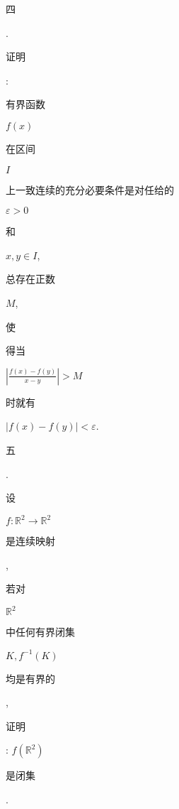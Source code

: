 \documentclass[10pt]{article}
\begin{document}
\begin{CJK}{UTF8}{mj}四\end{CJK}. \begin{CJK}{UTF8}{mj}证明\end{CJK}: \begin{CJK}{UTF8}{mj}有界函数\end{CJK} $f(x)$ \begin{CJK}{UTF8}{mj}在区间\end{CJK} $I$ \begin{CJK}{UTF8}{mj}上一致连续的充分必要条件是对任给的\end{CJK} $\varepsilon>0$ \begin{CJK}{UTF8}{mj}和\end{CJK} $x, y \in I$, \begin{CJK}{UTF8}{mj}总存在正数\end{CJK} $M$, \begin{CJK}{UTF8}{mj}使\end{CJK} \begin{CJK}{UTF8}{mj}得当\end{CJK} $\left|\frac{f(x)-f(y)}{x-y}\right|>M$ \begin{CJK}{UTF8}{mj}时就有\end{CJK} $|f(x)-f(y)|<\varepsilon$.

\begin{CJK}{UTF8}{mj}五\end{CJK}. \begin{CJK}{UTF8}{mj}设\end{CJK} $f: \mathbb{R}^{2} \rightarrow \mathbb{R}^{2}$ \begin{CJK}{UTF8}{mj}是连续映射\end{CJK}, \begin{CJK}{UTF8}{mj}若对\end{CJK} $\mathbb{R}^{2}$ \begin{CJK}{UTF8}{mj}中任何有界闭集\end{CJK} $K, f^{-1}(K)$ \begin{CJK}{UTF8}{mj}均是有界的\end{CJK}, \begin{CJK}{UTF8}{mj}证明\end{CJK}: $f\left(\mathbb{R}^{2}\right)$ \begin{CJK}{UTF8}{mj}是闭集\end{CJK}.
\end{document}
